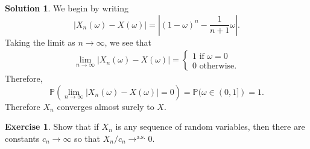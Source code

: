 \documentclass[12pt]{article}
\newcommand{\Prob}{\mathbb{P}}
\newcommand{\abs}[1]{ \left| #1 \right| }
\theoremstyle{definition}
\newtheorem{exer}{Exercise}
\newtheorem{sol}{Solution}
\theoremstyle{remark}
\begin{document}
\begin{sol}
    We begin by writing
    \begin{equation*}
        \abs{ X_{n}(\omega) - X(\omega)} = \abs{(1 - \omega)^{n} - \frac{1}{n+1} \omega}.
    \end{equation*}
    Taking the limit as $n\to \infty$, we see that
    \begin{align*}
    \lim_{n\to\infty} \abs{ X_{n}(\omega) - X(\omega)} 
    =
    \begin{cases}
        1 \text{ if } \omega = 0\\
        0 \text{ otherwise.}
    \end{cases}
    \end{align*}
    Therefore, 
    \begin{equation*}
        \Prob( \lim_{n\to \infty} \abs{ X_{n}(\omega) - X(\omega)}  = 0 ) = \Prob( \omega \in (0, 1] ) = 1.
    \end{equation*}
    Therefore $X_{n}$ converges almost surely to $X$.
\end{sol}

\newpage

\begin{exer}
    Show that if $X_{n}$ is any sequence of random variables, then there are constants $c_{n} \to \infty$ so that $X_{n}/c_{n} \to^{\text{a.s.}} 0$.
\end{exer}
\end{document}
